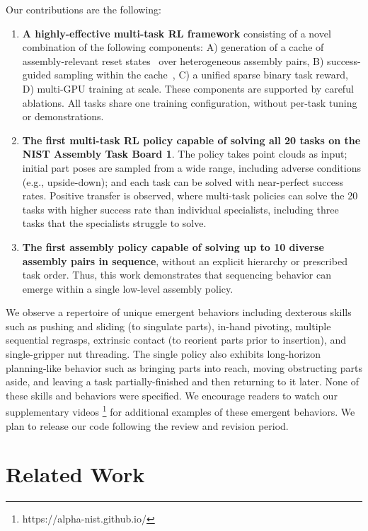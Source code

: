 Our contributions are the following:
\begin{enumerate}
    \item \textbf{A highly-effective multi-task RL framework} consisting of a novel combination of the following components: A) generation of a cache of assembly-relevant reset states~\cite{yin2026omnireset} over heterogeneous assembly pairs, B) success-guided sampling within the cache~\cite{zhang2026balanceddiet}, C) a unified sparse binary task reward, D) multi-GPU training at scale. These components are supported by careful ablations. All tasks share one training configuration, without per-task tuning or demonstrations.
    \item \textbf{The first multi-task RL policy capable of solving all 20 tasks on the NIST Assembly Task Board 1}. The policy takes point clouds as input; initial part poses are sampled from a wide range, including adverse conditions (e.g., upside-down); and each task can be solved with near-perfect success rates. Positive transfer is observed, where multi-task policies can solve the 20 tasks with higher success rate than individual specialists, including three tasks that the specialists struggle to solve.
    \item \textbf{The first assembly policy capable of solving up to 10 diverse assembly pairs in sequence}, without an explicit hierarchy or prescribed task order. Thus, this work demonstrates that sequencing behavior can emerge within a single low-level assembly policy.
\end{enumerate}

We observe a repertoire of unique emergent behaviors including dexterous skills such as pushing and sliding (to singulate parts), in-hand pivoting, multiple sequential regrasps, extrinsic contact (to reorient parts prior to insertion), and single-gripper nut threading.
The single policy also exhibits long-horizon planning-like behavior such as bringing parts into reach, moving obstructing parts aside, and leaving a task partially-finished and then returning to it later. None of these skills and behaviors were specified.
We encourage readers to watch our supplementary videos \footnote{https://alpha-nist.github.io/} for additional examples of these emergent behaviors.
We plan to release our code following the review and revision period.

\section{Related Work}
\label{sec:related-work}
